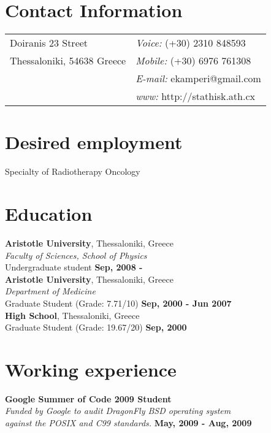 \documentclass[margin,line]{res}
\begin{document}

\begin{resume}
\section{\sc Contact Information}
\vspace{.05in}
\begin{tabular}{@{}p{2in}p{4in}}
Doiranis 23 Street           & {\it Voice:}   (+30) 2310 848593 \\
Thessaloniki, 54638 Greece   & {\it Mobile:}  (+30) 6976 761308 \\
                             & {\it E-mail:}  ekamperi@gmail.com\\
                             & {\it www:} http://stathisk.ath.cx\\
\end{tabular}

\section{\sc Desired employment}
Specialty of Radiotherapy Oncology

\section{\sc Education}
{\bf Aristotle University}, Thessaloniki, Greece\\
{\em Faculty of Sciences, School of Physics}\\
Undergraduate student \hfill {\bf Sep, 2008 - }\\

{\bf Aristotle University}, Thessaloniki, Greece\\
{\em Department of Medicine}\\
Graduate Student (Grade: 7.71/10) \hfill {\bf Sep, 2000 - Jun 2007}\\

{\bf High School}, Thessaloniki, Greece\\
Graduate Student (Grade: 19.67/20) \hfill {\bf Sep, 2000}\\

\section{\sc Working experience}
{\bf Google Summer of Code 2009 Student}\\
{\em Funded by Google to audit DragonFly BSD operating system\\ against the POSIX and C99 standards.}
\hfill {\bf May, 2009 - Aug, 2009}\\


\end{resume}
\end{document}
